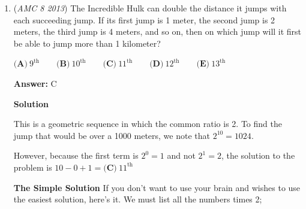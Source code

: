 \begin{enumerate}
 



\textbf{Solution 2}

Let's use \href{https://artofproblemsolving.com/wiki/index.php?title=Complementary\_counting}{complementary counting}. To start with, the unfavorable outcomes (in this case, not getting 2 consecutive heads) are: TTT, HTH, and THT. The probability of these three outcomes is $\frac{1}{8}$, $\frac{1}{4}$, and $\frac{1}{4}$, respectively. So the rest is exactly the probability of flipping at least two consecutive heads: $1-\frac{1}{8}-\frac{1}{4}-\frac{1}{4}=\frac{3}{8}$. It is the answer $\boxed{\textbf{(C)}\frac{3}{8}}$.

 



\textbf{Solution 3}

We can list out all the ways to flip a coin three times: HHH,HHT,HTH,THH,HTT,THT,TTH,TTT. Out of them, only HHH,HHT,THH, have at least two consecutive heads. Since there are three ways to flip at least two consecutive heads, and eight total choices, the answer is $\boxed{\textbf{(C)}\frac{3}{8}}$.

 Note: the problem where this is linked is covered 1:50-2:15

 


	\item (\textit{AMC 8 2013}) The Incredible Hulk can double the distance it jumps with each succeeding jump. If its first jump is 1 meter, the second jump is 2 meters, the third jump is 4 meters, and so on, then on which jump will it first be able to jump more than 1 kilometer?


 $\textbf{(A)}\ 9^\text{th} \qquad \textbf{(B)}\ 10^\text{th} \qquad \textbf{(C)}\ 11^\text{th} \qquad \textbf{(D)}\ 12^\text{th} \qquad \textbf{(E)}\ 13^\text{th}$

 \textbf{Answer: }C



\textbf{Solution}

This is a geometric sequence in which the common ratio is 2. To find the jump that would be over a 1000 meters, we note that $2^{10}=1024$.

 However, because the first term is $2^0=1$ and not $2^1=2$, the solution to the problem is $10-0+1=\boxed{\textbf{(C)}\ 11^{\text{th}}}$

 \textbf{The Simple Solution} If you don't want to use your brain and wishes to use the easiest solution, here's it. We must list all the numbers times 2;


\end{enumerate}
